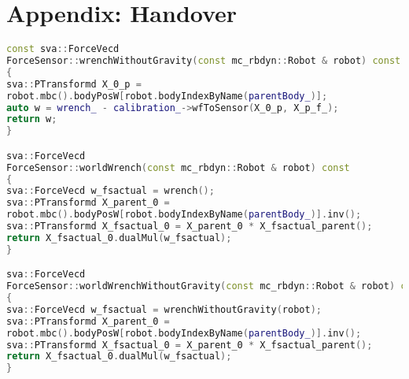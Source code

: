 \chapter{Appendix: Handover}

\begin{lstlisting}[language=C++,basicstyle=\footnotesize, caption={wrench}]
const sva::ForceVecd 
ForceSensor::wrenchWithoutGravity(const mc_rbdyn::Robot & robot) const
{
sva::PTransformd X_0_p = 
robot.mbc().bodyPosW[robot.bodyIndexByName(parentBody_)];
auto w = wrench_ - calibration_->wfToSensor(X_0_p, X_p_f_);
return w;
}

sva::ForceVecd 
ForceSensor::worldWrench(const mc_rbdyn::Robot & robot) const
{
sva::ForceVecd w_fsactual = wrench();
sva::PTransformd X_parent_0 = 
robot.mbc().bodyPosW[robot.bodyIndexByName(parentBody_)].inv();
sva::PTransformd X_fsactual_0 = X_parent_0 * X_fsactual_parent();
return X_fsactual_0.dualMul(w_fsactual);
}

sva::ForceVecd 
ForceSensor::worldWrenchWithoutGravity(const mc_rbdyn::Robot & robot) const
{
sva::ForceVecd w_fsactual = wrenchWithoutGravity(robot);
sva::PTransformd X_parent_0 = 
robot.mbc().bodyPosW[robot.bodyIndexByName(parentBody_)].inv();
sva::PTransformd X_fsactual_0 = X_parent_0 * X_fsactual_parent();
return X_fsactual_0.dualMul(w_fsactual);
}
\end{lstlisting}